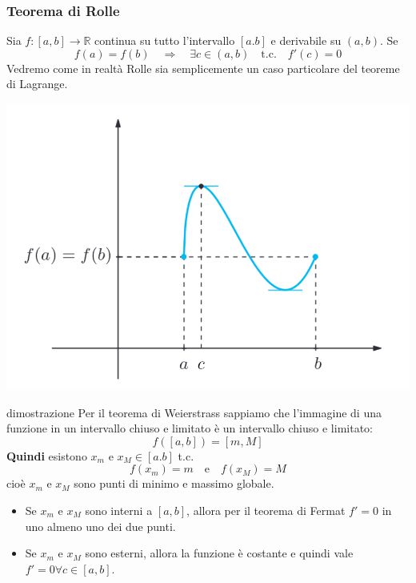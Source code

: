 \documentclass[x11names]{article}
\begin{document}
	
	\begin{center}
		\colorbox{myred}{\begin{minipage}{5.75in}
				\begin{redes}{}
					\subsubsection{Teorema di Rolle}
					Sia $f: [a,b] \to \mathbb{R}$ continua su tutto l'intervallo $[a.b]$ e derivabile su $(a,b)$. 
					Se
					\[
					f(a) = f(b) \quad \Longrightarrow \quad \exists c \in (a,b) \quad \text{t.c.} \quad f'(c) = 0
					\]
					Vedremo come in realtà Rolle sia semplicemente un caso particolare del teoreme di Lagrange.
				\end{redes}
		\end{minipage}}        
	\end{center}
	\begin{center}
		\includegraphics[scale=0.45]{figures/rolle}
	\end{center}
	\begin{es}{dimostrazione}
		Per il teorema di Weierstrass sappiamo che l'immagine di una funzione in un intervallo chiuso e limitato è un intervallo chiuso e limitato:
		\[
		f([a,b]) =  [m,M]
		\]
		\textbf{Quindi} esistono $x_m$ e $x_M \in [a.b]$ t.c. 
		\[
		f(x_m) = m \quad \text{e} \quad f(x_M) = M
		\]
		cioè $x_m$ e $x_M$ sono punti di minimo e massimo globale. 
		\begin{itemize}
			\item Se $x_m$ e $x_M$ sono interni a $[a,b]$, allora per il teorema di Fermat $f'=0$ in uno almeno uno dei due punti.
			\item Se $x_m$ e $x_M$ sono esterni, allora la funzione è costante e quindi vale $f'=0 \forall c \in [a,b]$.
		\end{itemize}
	\end{es}
	
\end{document}
